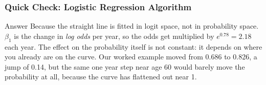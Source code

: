 \begin{frame}[fragile]\frametitle{Quick Check: Logistic Regression Algorithm}
\begin{block}{Answer}
Because the straight line is fitted in logit space, not in probability space. $\beta_1$ is the change in \emph{log odds} per year, so the odds get multiplied by $e^{0.78} = 2.18$ each year. The effect on the probability itself is not constant: it depends on where you already are on the curve. Our worked example moved from 0.686 to 0.826, a jump of 0.14, but the same one year step near age 60 would barely move the probability at all, because the curve has flattened out near 1.
\end{block}
\end{frame}








